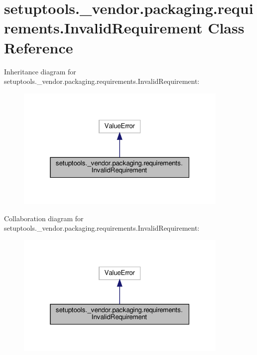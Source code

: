 \hypertarget{classsetuptools_1_1__vendor_1_1packaging_1_1requirements_1_1InvalidRequirement}{}\section{setuptools.\+\_\+vendor.\+packaging.\+requirements.\+Invalid\+Requirement Class Reference}
\label{classsetuptools_1_1__vendor_1_1packaging_1_1requirements_1_1InvalidRequirement}


Inheritance diagram for setuptools.\+\_\+vendor.\+packaging.\+requirements.\+Invalid\+Requirement\+:
\nopagebreak
\begin{figure}[H]
\begin{center}
\leavevmode
\includegraphics[width=289pt]{classsetuptools_1_1__vendor_1_1packaging_1_1requirements_1_1InvalidRequirement__inherit__graph}
\end{center}
\end{figure}


Collaboration diagram for setuptools.\+\_\+vendor.\+packaging.\+requirements.\+Invalid\+Requirement\+:
\nopagebreak
\begin{figure}[H]
\begin{center}
\leavevmode
\includegraphics[width=289pt]{classsetuptools_1_1__vendor_1_1packaging_1_1requirements_1_1InvalidRequirement__coll__graph}
\end{center}
\end{figure}


